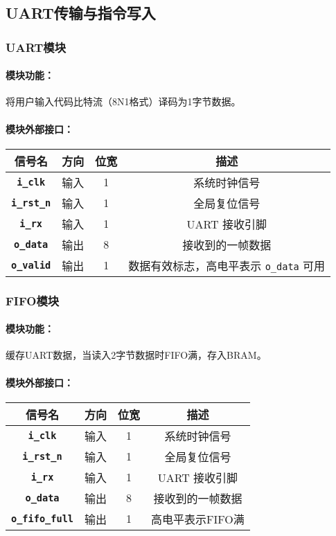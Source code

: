\documentclass[lang=cn,a4paper,newtx]{elegantpaper}
\begin{document}
\subsection{UART传输与指令写入}
\subsubsection{UART模块}
\paragraph{模块功能：}
将用户输入代码比特流（8N1格式）译码为1字节数据。
\paragraph{模块外部接口：}

\begin{longtable}{>{\bfseries}c c c c}
  \toprule
  信号名 & 方向 & 位宽 & 描述 \\
  \midrule
  \endhead
  
  \texttt{i\_clk}   & 输入  & 1      & 系统时钟信号 \\
  \texttt{i\_rst\_n} & 输入  & 1      & 全局复位信号 \\
  \texttt{i\_rx}    & 输入  & 1      & UART 接收引脚 \\
  \texttt{o\_data}  & 输出  & 8    & 接收到的一帧数据 \\
  \texttt{o\_valid} & 输出  & 1      & 数据有效标志，高电平表示 \texttt{o\_data} 可用 \\
  \bottomrule
  \end{longtable}

\subsubsection{FIFO模块}
\paragraph{模块功能：}
缓存UART数据，当读入2字节数据时FIFO满，存入BRAM。
\paragraph{模块外部接口：}
\begin{longtable}{>{\bfseries}c c c c}
  \toprule
  信号名 & 方向 & 位宽 & 描述 \\
  \midrule
  \endhead
  
  \texttt{i\_clk}   & 输入  & 1      & 系统时钟信号 \\
  \texttt{i\_rst\_n} & 输入  & 1      & 全局复位信号 \\
  \texttt{i\_rx}    & 输入  & 1      & UART 接收引脚 \\
  \texttt{o\_data}  & 输出  & 8    & 接收到的一帧数据 \\
  \texttt{o\_fifo\_full} & 输出  & 1      & 高电平表示FIFO满 \\
  \bottomrule
  \end{longtable}
\end{document}
